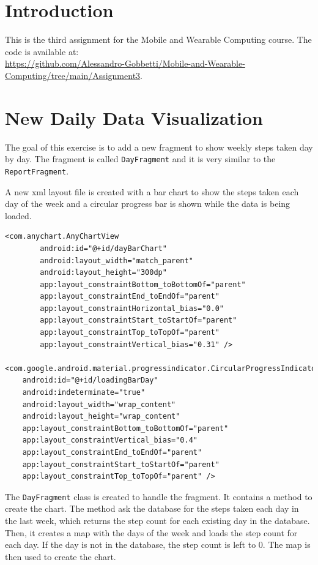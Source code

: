 \documentclass{usireport}
\begin{document}
\maketitlepage

\section{Introduction}
This is the third assignment for the Mobile and Wearable Computing course. The code is available at: \\\url{https://github.com/Alessandro-Gobbetti/Mobile-and-Wearable-Computing/tree/main/Assignment3}.

\section{New Daily Data Visualization}

The goal of this exercise is to add a new fragment to show weekly steps taken day by day. The fragment is called \texttt{DayFragment} and it is very similar to the \texttt{ReportFragment}.

A new xml layout file is created with a bar chart to show the steps taken each day of the week and a circular progress bar is shown while the data is being loaded. 
\begin{verbatim}
<com.anychart.AnyChartView
        android:id="@+id/dayBarChart"
        android:layout_width="match_parent"
        android:layout_height="300dp"
        app:layout_constraintBottom_toBottomOf="parent"
        app:layout_constraintEnd_toEndOf="parent"
        app:layout_constraintHorizontal_bias="0.0"
        app:layout_constraintStart_toStartOf="parent"
        app:layout_constraintTop_toTopOf="parent"
        app:layout_constraintVertical_bias="0.31" />

<com.google.android.material.progressindicator.CircularProgressIndicator
    android:id="@+id/loadingBarDay"
    android:indeterminate="true"
    android:layout_width="wrap_content"
    android:layout_height="wrap_content"
    app:layout_constraintBottom_toBottomOf="parent"
    app:layout_constraintVertical_bias="0.4"
    app:layout_constraintEnd_toEndOf="parent"
    app:layout_constraintStart_toStartOf="parent"
    app:layout_constraintTop_toTopOf="parent" />
\end{verbatim}

The \texttt{DayFragment} class is created to handle the fragment. It contains a method to create the chart. The method ask the database for the steps taken each day in the last week, which returns the step count for each existing day in the database. Then, it creates a map with the days of the week and loads the step count for each day. If the day is not in the database, the step count is left to 0. The map is then used to create the chart. 
\end{document}
